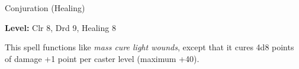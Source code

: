 \label{spell:Mass Cure Critical Wounds}

Conjuration (Healing)

\textbf{Level:} Clr 8, Drd 9, Healing 8

This spell functions like \textit{mass cure light wounds}, except that it cures 
4d8 points of damage +1 point per caster level (maximum +40).

